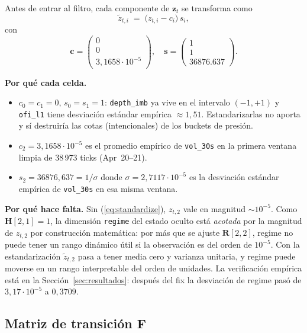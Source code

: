 \documentclass[journal,onecolumn,11pt]{IEEEtran}
\newcommand{\zv}{\mathbf{z}}
\newcommand{\Fm}{\mathbf{F}}
\newcommand{\Hm}{\mathbf{H}}
\newcommand{\Rm}{\mathbf{R}}
\begin{document}
Antes de entrar al filtro, cada componente de $\zv_t$ se transforma como
\begin{equation}
\tilde{z}_{t,i} \;=\; \bigl(z_{t,i} - c_i\bigr)\, s_i,
\label{eq:standardize}
\end{equation}
con
\begin{equation}
\mathbf{c} = \begin{pmatrix}0\\0\\3{,}1658\!\cdot\!10^{-5}\end{pmatrix},\quad
\mathbf{s} = \begin{pmatrix}1\\1\\\num{36876,637}\end{pmatrix}.
\label{eq:standardize-vals}
\end{equation}

\noindent
\textbf{Por qué cada celda.}
\begin{itemize}
\item $c_0=c_1=0$, $s_0=s_1=1$: \texttt{depth\_imb} ya vive en el
      intervalo $(-1,+1)$ y \texttt{ofi\_l1} tiene desviación
      estándar empírica $\approx 1{,}51$. Estandarizarlas no aporta y
      sí destruiría las cotas (intencionales) de los buckets de presión.
\item $c_2 = 3{,}1658\!\cdot\!10^{-5}$ es el promedio empírico de
      \texttt{vol\_30s} en la primera ventana limpia de 38\,973 ticks
      (Apr~20--21).
\item $s_2 = 36876{,}637 = 1/\sigma$ donde $\sigma = 2{,}7117\!\cdot\!10^{-5}$
      es la desviación estándar empírica de \texttt{vol\_30s} en esa
      misma ventana.
\end{itemize}

\noindent
\textbf{Por qué hace falta.} Sin (\ref{eq:standardize}), $z_{t,2}$ vale
en magnitud $\sim\!10^{-5}$. Como $\Hm[2,1]=1$, la dimensión
\texttt{regime} del estado oculto está \emph{acotada} por la magnitud
de $z_{t,2}$ por construcción matemática: por más que se ajuste
$\Rm[2,2]$, regime no puede tener un rango dinámico útil si la
observación es del orden de $10^{-5}$. Con la estandarización
$\tilde{z}_{t,2}$ pasa a tener media cero y varianza unitaria, y
regime puede moverse en un rango interpretable del orden de unidades.
La verificación empírica está en la Sección~\ref{sec:resultados}:
después del fix la desviación de regime pasó de $3{,}17\!\cdot\!10^{-5}$
a $0{,}3709$.

\subsection{Matriz de transición $\Fm$}
\end{document}
